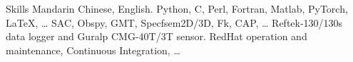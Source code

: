 
\begin{rubric}{Skills}
\entry*[Languages]
	Mandarin Chinese, English.
	Python, C, Perl, Fortran, Matlab, PyTorch, \LaTeX, \ldots
{}
	SAC, Obspy, GMT, Specfsem2D/3D, Fk, CAP, \ldots
\entry*[Instruments]
     Reftek-130/130s data logger and Guralp CMG-40T/3T sensor.
\entry*[Misc.]
	RedHat operation and maintenance, Continuous Integration, \ldots
\end{rubric}
